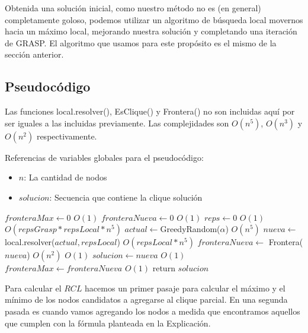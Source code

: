 Obtenida una solución inicial, como nuestro método no es (en general) completamente goloso, podemos utilizar un algoritmo de búsqueda local movernos hacia un máximo local, mejorando nuestra solución y completando una iteración de GRASP. El algoritmo que usamos para este propósito es el mismo de la sección anterior.

\subsection{Pseudocódigo}

Las funciones local.resolver(), EsClique() y Frontera() no son incluidas aquí por ser iguales a las incluidas previamente. Las complejidades son $O(n^5)$, $O(n^3)$ y $O(n^2)$ respectivamente.

Referencias de variables globales para el pseudocódigo:
\begin{itemize}
    \item $n$: La cantidad de nodos
    \item $solucion$: Secuencia que contiene la clique solución
\end{itemize}

\begin{algorithm}[H]
\begin{algorithmic}
    \State $fronteraMax \gets 0$                    \Comment $O(1)$
    \State $fronteraNueva \gets 0$                  \Comment $O(1)$
    \State $reps \gets 0$                           \Comment $O(1)$
                               \Comment $O(repsGrasp * repsLocal * n^5)$
        \State $actual \gets $GreedyRandom($\alpha$)              \Comment $O(n^5)$
        \State $nueva \gets$ local.resolver($actual, repsLocal$)  \Comment $O(repsLocal * n^5)$
        \State $fronteraNueva \gets$ Frontera($nueva$)            \Comment $O(n^2)$
                             \Comment $O(1)$
            \State $solucion \gets nueva$                       \Comment $O(1)$
            \State $fronteraMax \gets fronteraNueva$            \Comment $O(1)$
        \EndIf
    \EndFor
    \State return $solucion$
\EndFunction
\end{algorithmic}
\end{algorithm}
Para calcular el $RCL$ hacemos un primer pasaje para calcular el máximo y el mínimo de los nodos candidatos a agregarse al clique parcial. En una segunda pasada es cuando vamos agregando los nodos a medida que encontramos aquellos que cumplen con la fórmula planteada en la Explicación.

